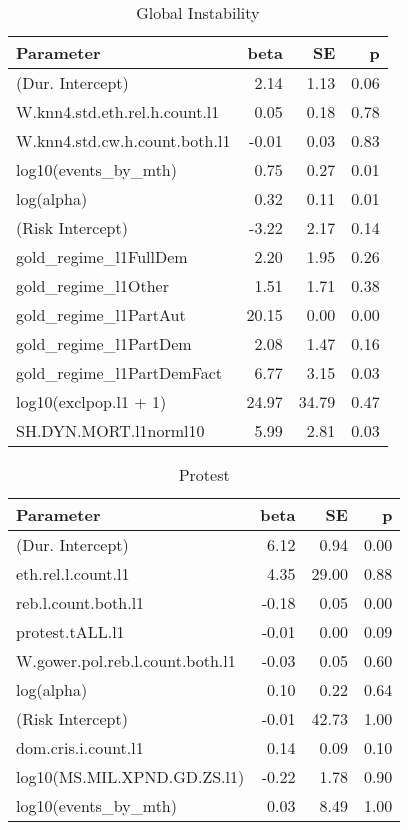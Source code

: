 \documentclass[pdftex,11pt]{article}
\begin{document}
\begin{table*}[ht]
\centering
\begin{tabular}{lrrr}
  \hline
Parameter & beta & SE & p \\ 
  \hline
(Dur. Intercept) & 2.14 & 1.13 & 0.06 \\ 
  W.knn4.std.eth.rel.h.count.l1 & 0.05 & 0.18 & 0.78 \\ 
  W.knn4.std.cw.h.count.both.l1 & -0.01 & 0.03 & 0.83 \\ 
  log10(events\_by\_mth) & 0.75 & 0.27 & 0.01 \\ 
  log(alpha) & 0.32 & 0.11 & 0.01 \\ 
  (Risk Intercept) & -3.22 & 2.17 & 0.14 \\ 
  gold\_regime\_l1FullDem & 2.20 & 1.95 & 0.26 \\ 
  gold\_regime\_l1Other & 1.51 & 1.71 & 0.38 \\ 
  gold\_regime\_l1PartAut & 20.15 & 0.00 & 0.00 \\ 
  gold\_regime\_l1PartDem & 2.08 & 1.47 & 0.16 \\ 
  gold\_regime\_l1PartDemFact & 6.77 & 3.15 & 0.03 \\ 
  log10(exclpop.l1 + 1) & 24.97 & 34.79 & 0.47 \\ 
  SH.DYN.MORT.l1norml10 & 5.99 & 2.81 & 0.03 \\ 
   \hline
\end{tabular}
\caption{Global Instability} 
\label{model3}
\end{table*}
\begin{table*}[ht]
\centering
\begin{tabular}{lrrr}
  \hline
Parameter & beta & SE & p \\ 
  \hline
(Dur. Intercept) & 6.12 & 0.94 & 0.00 \\ 
  eth.rel.l.count.l1 & 4.35 & 29.00 & 0.88 \\ 
  reb.l.count.both.l1 & -0.18 & 0.05 & 0.00 \\ 
  protest.tALL.l1 & -0.01 & 0.00 & 0.09 \\ 
  W.gower.pol.reb.l.count.both.l1 & -0.03 & 0.05 & 0.60 \\ 
  log(alpha) & 0.10 & 0.22 & 0.64 \\ 
  (Risk Intercept) & -0.01 & 42.73 & 1.00 \\ 
  dom.cris.i.count.l1 & 0.14 & 0.09 & 0.10 \\ 
  log10(MS.MIL.XPND.GD.ZS.l1) & -0.22 & 1.78 & 0.90 \\ 
  log10(events\_by\_mth) & 0.03 & 8.49 & 1.00 \\ 
   \hline
\end{tabular}
\caption{Protest} 
\label{model4}
\end{table*}
\end{document}
